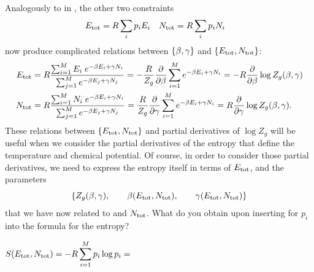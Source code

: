 Analogously to  in , the other two constraints
\begin{align*}
  E_{\text{tot}} & = R \sum_i p_i E_i &
  N_{\text{tot}} & = R \sum_i p_i N_i
\end{align*}
now produce complicated relations between $\left\{\beta, \gamma\right\}$ and $\left\{E_{\text{tot}}, N_{\text{tot}}\right\}$:
\begin{align}
  E_{\text{tot}} & = R \frac{\sum_{i = 1}^M E_i \; e^{-\beta E_i + \gamma N_i}}{\sum_{j = 1}^M e^{-\beta E_j + \gamma N_j}} = -\frac{R}{Z_g} \frac{\partial }{\partial \beta} \sum_{i = 1}^M e^{-\beta E_i + \gamma N_i} = -R \frac{\partial }{\partial \beta} \log Z_g(\beta, \gamma) \label{eq:grand_be_deriv} \\
  N_{\text{tot}} & = R \frac{\sum_{i = 1}^M N_i \; e^{-\beta E_i + \gamma N_i}}{\sum_{j = 1}^M e^{-\beta E_j + \gamma N_j}} =  \frac{R}{Z_g} \frac{\partial }{\partial \gamma} \sum_{i = 1}^M e^{-\beta E_i + \gamma N_i} =  R \frac{\partial }{\partial \gamma} \log Z_g(\beta, \gamma). \label{eq:grand_ga_deriv}
\end{align}
These relations between $\left\{E_{\text{tot}}, N_{\text{tot}}\right\}$ and partial derivatives of $\log Z_g$ will be useful when we consider the partial derivatives of the entropy that define the temperature and chemical potential.
Of course, in order to consider those partial derivatives, we need to express the entropy itself in terms of $E_{\text{tot}}$, \Ntot and the parameters
\begin{equation*}
  \left\{Z_g(\beta, \gamma), \qquad \beta(E_{\text{tot}}, N_{\text{tot}}), \qquad \gamma(E_{\text{tot}}, N_{\text{tot}})\right\}
\end{equation*}
that we have now related to \Etot and $N_{\text{tot}}$.
What do you obtain upon inserting  for $p_i$ into the formula for the entropy?
\begin{mdframed}
  $\displaystyle S(E_{\text{tot}}, N_{\text{tot}}) = -R \sum_{i = 1}^M p_i \log p_i = $ \\[120 pt]
\end{mdframed}

